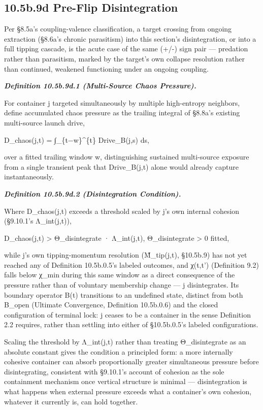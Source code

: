 \documentclass[
]{article}
\begin{document}
\hypertarget{b.9d-pre-flip-disintegration}{%
\subsection{10.5b.9d Pre-Flip
Disintegration}\label{b.9d-pre-flip-disintegration}}

Per §8.5a's coupling-valence classification, a target crossing from
ongoing extraction (§8.6a's chronic parasitism) into this section's
disintegration, or into a full tipping cascade, is the acute case of the
same (+/-) sign pair --- predation rather than parasitism, marked by the
target's own collapse resolution rather than continued, weakened
functioning under an ongoing coupling.

\emph{\textbf{Definition 10.5b.9d.1 (Multi-Source Chaos Pressure).}}

For container j targeted simultaneously by multiple high-entropy
neighbors, define accumulated chaos pressure as the trailing integral of
§8.8a's existing multi-source launch drive,

D\_chaos(j,t) = ∫\_\{t−w\}\^{}\{t\} Drive\_B(j,s) ds,

over a fitted trailing window w, distinguishing sustained multi-source
exposure from a single transient peak that Drive\_B(j,t) alone would
already capture instantaneously.

\emph{\textbf{Definition 10.5b.9d.2 (Disintegration Condition).}}

Where D\_chaos(j,t) exceeds a threshold scaled by j's own internal
cohesion (§9.10.1's Λ\_int(j,t)),

D\_chaos(j,t) \textgreater{} Θ\_disintegrate · Λ\_int(j,t),
Θ\_disintegrate \textgreater{} 0 fitted,

while j's own tipping-momentum resolution (M̃\_tip(j,t), §10.5b.9) has
not yet reached any of Definition 10.5b.0.5's labeled outcomes, and
χ(t,t') (Definition 9.2) falls below χ\_min during this same window as a
direct consequence of the pressure rather than of voluntary membership
change --- j disintegrates. Its boundary operator B(t) transitions to an
undefined state, distinct from both B\_open (Ultimate Convergence,
Definition 10.5b.0.6) and the closed configuration of terminal lock: j
ceases to be a container in the sense Definition 2.2 requires, rather
than settling into either of §10.5b.0.5's labeled configurations.

Scaling the threshold by Λ\_int(j,t) rather than treating
Θ\_disintegrate as an absolute constant gives the condition a principled
form: a more internally cohesive container can absorb proportionally
greater simultaneous pressure before disintegrating, consistent with
§9.10.1's account of cohesion as the sole containment mechanism once
vertical structure is minimal --- disintegration is what happens when
external pressure exceeds what a container's own cohesion, whatever it
currently is, can hold together.
\end{document}
